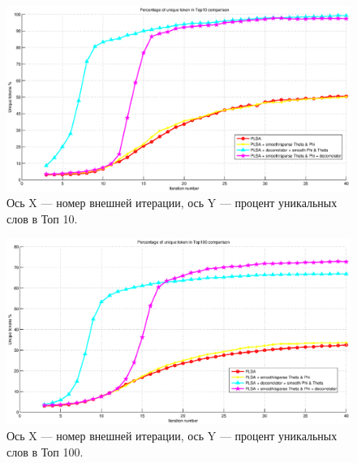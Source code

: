 \begin{figure}[h!]\center
\includegraphics[scale = 0.5]{top10.eps}
\caption{Ось X --- номер внешней итерации, ось Y --- процент уникальных слов в Топ 10.}
\end{figure}

\begin{figure}[h!]\center
\includegraphics[scale = 0.5]{top100.eps}
\caption{Ось X --- номер внешней итерации, ось Y --- процент уникальных слов в Топ 100.}
\end{figure}